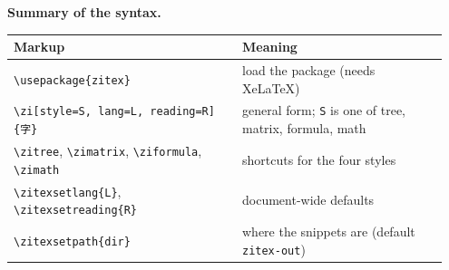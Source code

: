 \documentclass[11pt]{article}
\newcommand{\cmd}[1]{\texttt{\textbackslash #1}}               %
\begin{document}
\medskip
\noindent\textbf{Summary of the syntax.}
\begin{center}
\small
\begin{tabular}{@{}p{0.5\linewidth}p{0.45\linewidth}@{}}
\toprule
Markup & Meaning \\
\midrule
\cmd{usepackage\{zitex\}}                         & load the package (needs XeLaTeX) \\
\cmd{zi[style=S, lang=L, reading=R]\{字\}}         & general form; \texttt{S} is one of tree, matrix, formula, math \\
\cmd{zitree}, \cmd{zimatrix}, \cmd{ziformula}, \cmd{zimath} & shortcuts for the four styles \\
\cmd{zitexsetlang\{L\}}, \cmd{zitexsetreading\{R\}}  & document-wide defaults \\
\cmd{zitexsetpath\{dir\}}                          & where the snippets are (default \texttt{zitex-out}) \\
\bottomrule
\end{tabular}
\end{center}
\end{document}
